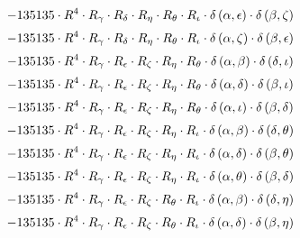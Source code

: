\begin{subequations}
\begin{gather}
 \\[0.2em] \notag 		 - 135135 \cdot R^{4} \cdot R_{\gamma{}} \cdot R_{\delta{}} \cdot R_{\eta{}} \cdot R_{\theta{}} \cdot R_{\iota{}} \cdot \delta{}\left(\alpha{}, \epsilon{}\right) \cdot \delta{}\left(\beta{}, \zeta{}\right) 
 \\[0.2em] \notag 		 - 135135 \cdot R^{4} \cdot R_{\gamma{}} \cdot R_{\delta{}} \cdot R_{\eta{}} \cdot R_{\theta{}} \cdot R_{\iota{}} \cdot \delta{}\left(\alpha{}, \zeta{}\right) \cdot \delta{}\left(\beta{}, \epsilon{}\right) 
 \\[0.2em] \notag 		 - 135135 \cdot R^{4} \cdot R_{\gamma{}} \cdot R_{\epsilon{}} \cdot R_{\zeta{}} \cdot R_{\eta{}} \cdot R_{\theta{}} \cdot \delta{}\left(\alpha{}, \beta{}\right) \cdot \delta{}\left(\delta{}, \iota{}\right) 
 \\[0.2em] \notag 		 - 135135 \cdot R^{4} \cdot R_{\gamma{}} \cdot R_{\epsilon{}} \cdot R_{\zeta{}} \cdot R_{\eta{}} \cdot R_{\theta{}} \cdot \delta{}\left(\alpha{}, \delta{}\right) \cdot \delta{}\left(\beta{}, \iota{}\right) 
 \\[0.2em] \notag 		 - 135135 \cdot R^{4} \cdot R_{\gamma{}} \cdot R_{\epsilon{}} \cdot R_{\zeta{}} \cdot R_{\eta{}} \cdot R_{\theta{}} \cdot \delta{}\left(\alpha{}, \iota{}\right) \cdot \delta{}\left(\beta{}, \delta{}\right) 
 \\[0.2em] \notag 		 - 135135 \cdot R^{4} \cdot R_{\gamma{}} \cdot R_{\epsilon{}} \cdot R_{\zeta{}} \cdot R_{\eta{}} \cdot R_{\iota{}} \cdot \delta{}\left(\alpha{}, \beta{}\right) \cdot \delta{}\left(\delta{}, \theta{}\right) 
 \\[0.2em] \notag 		 - 135135 \cdot R^{4} \cdot R_{\gamma{}} \cdot R_{\epsilon{}} \cdot R_{\zeta{}} \cdot R_{\eta{}} \cdot R_{\iota{}} \cdot \delta{}\left(\alpha{}, \delta{}\right) \cdot \delta{}\left(\beta{}, \theta{}\right) 
 \\[0.2em] \notag 		 - 135135 \cdot R^{4} \cdot R_{\gamma{}} \cdot R_{\epsilon{}} \cdot R_{\zeta{}} \cdot R_{\eta{}} \cdot R_{\iota{}} \cdot \delta{}\left(\alpha{}, \theta{}\right) \cdot \delta{}\left(\beta{}, \delta{}\right) 
 \\[0.2em] \notag 		 - 135135 \cdot R^{4} \cdot R_{\gamma{}} \cdot R_{\epsilon{}} \cdot R_{\zeta{}} \cdot R_{\theta{}} \cdot R_{\iota{}} \cdot \delta{}\left(\alpha{}, \beta{}\right) \cdot \delta{}\left(\delta{}, \eta{}\right) 
 \\[0.2em] \notag 		 - 135135 \cdot R^{4} \cdot R_{\gamma{}} \cdot R_{\epsilon{}} \cdot R_{\zeta{}} \cdot R_{\theta{}} \cdot R_{\iota{}} \cdot \delta{}\left(\alpha{}, \delta{}\right) \cdot \delta{}\left(\beta{}, \eta{}\right) 

\end{gather}
\end{subequations}
